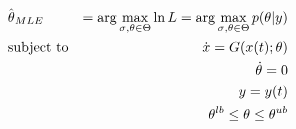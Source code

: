 \documentclass[]{scrartcl}
\begin{document}
\begin{equation}
	\begin{aligned} 
		&\hat{{\color{black} \theta}}_{MLE} &= \arg \max_{{\color{black} \sigma}, {\color{black} \theta} \in \Theta} \ln L = \arg \max_{{\color{black} \sigma},{\color{black} \theta} \in \Theta} p({\color{black} \theta}|{\color{black}y}) \\
		&\text{subject to}
		& \dot{ {\color{black}x} } = {\color{black}G}({\color{black} x}(t);{\color{black} \theta}) \\
		&& {\color{black} \dot{\theta}} = 0 \\
		&& {\color{black}y} = {\color{black}y}(t) \\
		&& {\color{black} \theta}^{lb} \leq {\color{black} \theta} \leq {\color{black} \theta}^{ub}
	\end{aligned}
\end{equation} 
\end{document}
